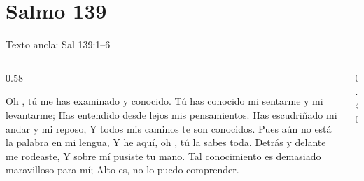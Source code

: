 \section{Salmo 139}

\begin{frame}{Texto ancla: Sal 139:1--6}
\begin{columns}[c,onlytextwidth]
\begin{column}{0.58\textwidth}
\begin{cita}Oh \SENOR{}, tú me has examinado y conocido. Tú has conocido mi sentarme y mi levantarme; Has entendido desde lejos mis pensamientos. Has escudriñado mi andar y mi reposo, Y todos mis caminos te son conocidos. Pues aún no está la palabra en mi lengua, Y he aquí, oh \SENOR{}, tú la sabes toda. Detrás y delante me rodeaste, Y sobre mí pusiste tu mano. Tal conocimiento es demasiado maravilloso para mí; Alto es, no lo puedo comprender.\end{cita}
\end{column}
\begin{column}{0.40\textwidth}\end{column}
\end{columns}
\end{frame}

